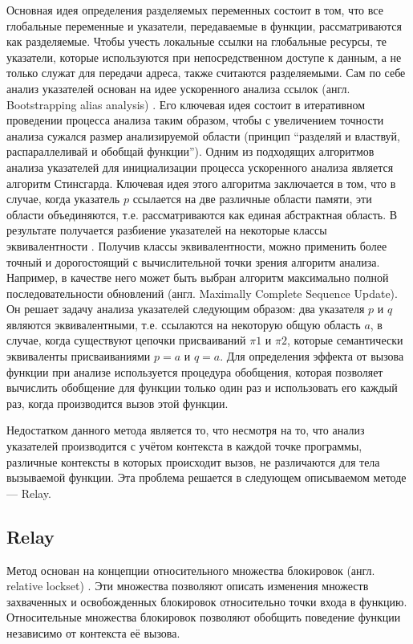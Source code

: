Основная идея определения разделяемых переменных состоит в том, что все глобальные переменные и указатели, передаваемые в функции, рассматриваются как разделяемые. Чтобы учесть локальные ссылки на глобальные ресурсы, те указатели, которые используются при непосредственном доступе к данным, а не только служат для передачи адреса, также считаются разделяемыми. Сам по себе анализ указателей основан на идее ускоренного анализа ссылок (англ. Bootstrapping alias analysis) \cite{Bootstrapping}. Его ключевая идея состоит в итеративном проведении процесса анализа таким образом, чтобы с увеличением точности анализа сужался размер анализируемой области (принцип “разделяй и властвуй, распараллеливай и обобщай функции”). Одним из подходящих алгоритмов анализа указателей для инициализации процесса ускоренного анализа  является алгоритм Стинсгарда. Ключевая идея этого алгоритма заключается в том, что в случае, когда указатель $p$ ссылается на две различные области памяти, эти области объединяются, т.е. рассматриваются как единая абстрактная область. В результате получается разбиение указателей на некоторые классы эквивалентности \cite{Steensgaard}. Получив классы эквивалентности, можно применить более точный и дорогостоящий с вычислительной точки зрения алгоритм анализа. Например, в качестве него может быть выбран алгоритм максимально полной последовательности обновлений (англ. Maximally Complete Sequence Update). Он решает задачу анализа указателей следующим образом: два указателя $p$ и $q$ являются эквивалентными, т.е. ссылаются на некоторую общую область $a$, в случае, когда существуют цепочки присваиваний $\pi1$ и $\pi2$, которые семантически эквиваленты присваиваниями $p=a$ и $q=a$.  Для определения эффекта от вызова функции при анализе используется процедура обобщения, которая позволяет вычислить обобщение для функции только один раз и использовать его каждый раз, когда производится вызов этой функции.

Недостатком данного метода является то, что несмотря на то, что анализ указателей производится с учётом контекста в каждой точке программы, различные контексты в которых происходит вызов, не различаются для тела вызываемой функции. Эта проблема решается в следующем описываемом методе — Relay.

\subsection{Relay}

Метод основан на концепции относительного множества блокировок (англ. relative lockset) \cite{Relay}. Эти множества позволяют описать изменения множеств захваченных и освобожденных блокировок относительно точки входа в функцию. Относительные множества блокировок позволяют обобщить поведение функции независимо от контекста её вызова.


